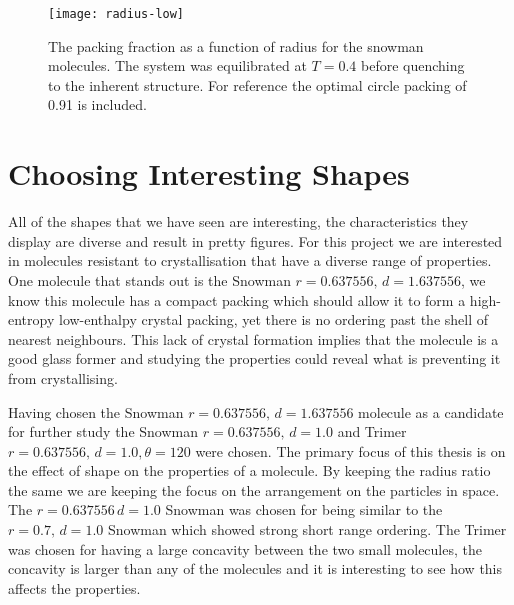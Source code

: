 \begin{figure}
    \centering
    \texttt{[image: radius-low]}
    \caption[Packing fraction of snowmen as a function of radius ($T=0.4$)]{The packing fraction as a function of radius for the snowman molecules. The system was equilibrated at $T=0.4$ before quenching to the inherent structure. For reference the optimal circle packing of 0.91 is included.}
    \label{fig:snowman radius low}
\end{figure}

\section{Choosing Interesting Shapes}

All of the shapes that we have seen are interesting, the characteristics they display are diverse and result in pretty figures. For this project we are interested in molecules resistant to crystallisation that have a diverse range of properties. One molecule that stands out is the Snowman $r=0.637556,\,d=1.637556$, we know this molecule has a compact packing which should allow it to form a high-entropy low-enthalpy crystal packing, yet there is no ordering past the shell of nearest neighbours. This lack of crystal formation implies that the molecule is a good glass former and studying the properties could reveal what is preventing it from crystallising.

Having chosen the Snowman $r=0.637556,\, d=1.637556$ molecule as a candidate for further study the Snowman $r=0.637556,\,d=1.0$ and Trimer $r=0.637556,\,d=1.0,\theta=120$ were chosen. The primary focus of this thesis is on the effect of shape on the properties of a molecule. By keeping the radius ratio the same we are keeping the focus on the arrangement on the particles in space. The $r=0.637556\,d=1.0$ Snowman was chosen for being similar to the $r=0.7,\,d=1.0$ Snowman which showed strong short range ordering. The Trimer was chosen for having a large concavity between the two small molecules, the concavity is larger than any of the molecules and it is interesting to see how this affects the properties.



